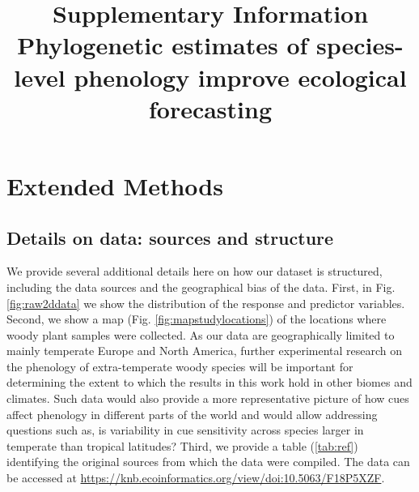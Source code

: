 \documentclass[11pt]{article}
\def\labelitemi{--}
\begin{document}


% 

\title{Supplementary Information\\
Phylogenetic estimates of species-level phenology improve ecological forecasting}
\maketitle


\renewcommand\contentsname{Table of contents}
\tableofcontents




\renewcommand{\thetable}{S\arabic{table}}
\renewcommand{\thefigure}{S\arabic{figure}}
\renewcommand{\labelitemi}{$-$}









\clearpage



\section{Extended Methods}

\subsection{Details on data: sources and structure}

We provide several additional details here on how our dataset is structured, including the data sources and the geographical bias of the data. First, in Fig. \ref{fig:raw2ddata} we show the distribution of the response and predictor variables. Second, we show a map (Fig. \ref{fig:mapstudylocations}) of the locations where woody plant samples were collected. As our data are geographically limited to mainly temperate Europe and North America, further experimental research on the phenology of extra-temperate woody species will be important for determining the extent to which the results in this work hold in other biomes and climates. Such data would also provide a more representative picture of how cues affect phenology in different parts of the world and would allow addressing questions such as, is variability in cue sensitivity across species larger in temperate than tropical latitudes? Third, we provide a table (\ref{tab:ref}) identifying the original sources from which the data were compiled. The data can be accessed at \url{https://knb.ecoinformatics.org/view/doi:10.5063/F18P5XZF}.
\end{document}

